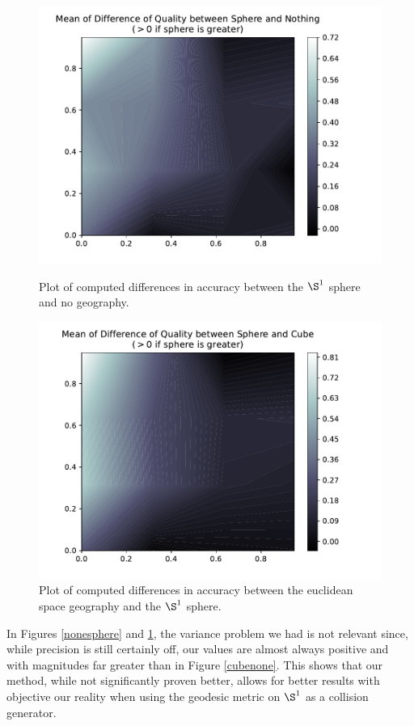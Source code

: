 \documentclass[math, info, english]{cours}
\begin{document}
\begin{figure}[h]
	\centering
	\hfill
	\begin{minipage}{.45\textwidth}
		\includegraphics[width=\linewidth]{../Figures/qual_diff_sphere_none}
		\caption{Plot of computed differences in accuracy between the $\S^{1}$ sphere and no geography.}
	\label{nonesphere}
	\end{minipage}
	\hfill
	\begin{minipage}{.45\textwidth}
		\includegraphics[width=\linewidth]{../Figures/qual_diff_sphere_cube}
	\caption{Plot of computed differences in accuracy between the euclidean space geography and the $\S^{1}$ sphere.}
	\label{cubesphere}
	\end{minipage}
	\hfill
\end{figure}

In Figures \ref{nonesphere} and \ref{cubesphere}, the variance problem we had is not relevant since, while precision is still certainly off, our values are almost always positive and with magnitudes far greater than in Figure \ref{cubenone}.
This shows that our method, while not significantly proven better, allows for better results with objective our reality when using the geodesic metric on $\S^{1}$ as a collision generator.


\appendix


\end{document}
